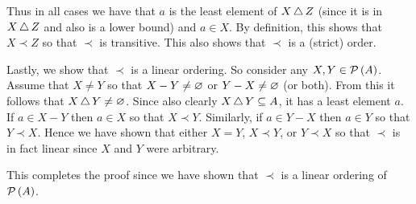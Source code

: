 {{    Thus in all cases we have that $a$ is the least element of $X \,\triangle\, Z$ (since it is in $X \,\triangle\, Z$ and also is a lower bound) and $a \in X$.
    By definition, this shows that $X \prec Z$ so that $\prec$ is transitive.
    This also shows that $\prec$ is a (strict) order.

    Lastly, we show that $\prec$ is a linear ordering.
    So consider any $X, Y \in \mathcal{P}\left(A\right)$.
    Assume that $X \neq Y$ so that $X - Y \neq \varnothing$ or $Y - X \neq \varnothing$ (or both).
    From this it follows that $X \,\triangle\, Y \neq \varnothing$.
    Since also clearly $X \,\triangle\, Y \subseteq A$, it has a least element $a$.
    If $a \in X - Y$ then $a \in X$ so that $X \prec Y$.
    Similarly, if $a \in Y - X$ then $a \in Y$ so that $Y \prec X$.
    Hence we have shown that either $X = Y$, $X \prec Y$, or $Y \prec X$ so that $\prec$ is in fact linear since $X$ and $Y$ were arbitrary.

    This completes the proof since we have shown that $\prec$ is a linear ordering of $\mathcal{P}\left(A\right)$.
  }
}

